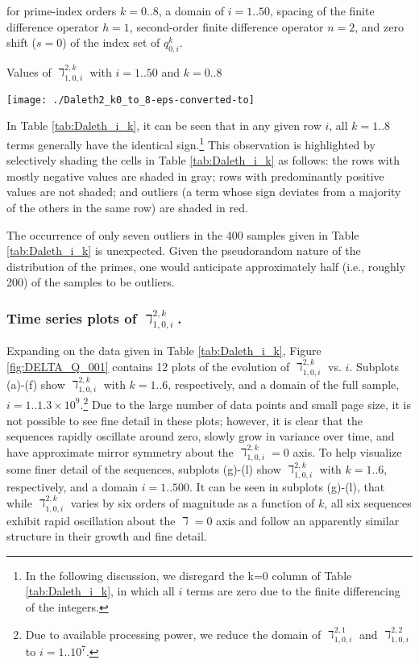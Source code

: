 \documentclass[12pt,longtitle,times]{amsart}
\begin{document}
for prime-index orders $k=0..8$, a domain of $i=1..50{}$, spacing of the finite difference operator $h=1$, second-order finite difference operator $n=2$, and zero shift ($s=0$) of the index set of $q_{0,i}^k$.

\begin{table}[b]
\centering
\caption{Values of $\daleth_{1,0,i}^{2,k}$ with $i = 1..50$ and $k = 0..8$}
\texttt{[image: ./Daleth2\_k0\_to\_8-eps-converted-to]}
\label{tab:Daleth_i_k}
\end{table}

In Table \ref{tab:Daleth_i_k}, it can be seen that in any given row $i$, all $k=1..8$ terms generally have the identical sign.\footnote{In the following discussion, we disregard the k=0 column of Table \ref{tab:Daleth_i_k}, in which all $i$ terms are zero due to the finite differencing of the integers.} This observation is highlighted by selectively shading the cells in Table \ref{tab:Daleth_i_k} as follows: the rows with mostly negative values are shaded in gray; rows with predominantly positive values are not shaded; and outliers (a term whose sign deviates from a majority of the others in the same row) are shaded in red.

\clearpage

The occurrence of only seven outliers in the 400 samples given in Table \ref{tab:Daleth_i_k} is unexpected. Given the pseudorandom nature of the distribution of the primes, one would anticipate approximately half (i.e., roughly 200) of the samples to be outliers. 

\subsubsection[short]{Time series plots of $\daleth_{1,0,i}^{2,k}$.} Expanding on the data given in Table \ref{tab:Daleth_i_k}, Figure \ref{fig:DELTA_Q_001} contains 12 plots of the evolution of $\daleth_{1,0,i}^{2,k}$ vs. $i$. Subplots (a)-(f) show $\daleth_{1,0,i}^{2,k}$ with $k=1..6$, respectively, and a domain of the full sample, $i=1..1.3\times{}10^9$.\footnote{Due to available processing power, we reduce the domain of $\daleth_{1,0,i}^{2,1}$ and $\daleth_{1,0,i}^{2,2}$ to $i=1..10^7.$} Due to the large number of data points and small page size, it is not possible to see fine detail in these plots; however, it is clear that the sequences rapidly oscillate around zero, slowly grow in variance over time, and have approximate mirror symmetry about the $\daleth_{1,0,i}^{2,k} = 0$ axis. To help visualize some finer detail of the sequences, subplots (g)-(l) show $\daleth_{1,0,i}^{2,k}$ with $k=1..6$, respectively, and a domain $i = 1..500$. It can be seen in subplots (g)-(l), that while $\daleth_{1,0,i}^{2,k}$ varies by six orders of magnitude as a function of $k$, all six sequences exhibit rapid oscillation about the $\daleth=0$ axis and follow an apparently similar structure in their growth and fine detail.
\end{document}
